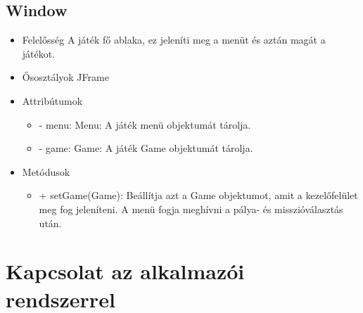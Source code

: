 \subsection{Window}
\begin{itemize}
\item Felelősség \newline
A játék fő ablaka, ez jeleníti meg a menüt és aztán magát a játékot.
\item Ősosztályok\newline
JFrame
\item Attribútumok
	\begin{itemize}
		\item - menu: Menu: A játék menü objektumát tárolja.
		\item - game: Game: A játék Game objektumát tárolja.
	\end{itemize}
\item Metódusok
	\begin{itemize}
		\item + setGame(Game): Beállítja azt a Game objektumot, amit a kezelőfelület meg fog jeleníteni. A menü fogja meghívni a pálya- és misszióválasztás után.
	\end{itemize}
\end{itemize}

\section{Kapcsolat az alkalmazói rendszerrel}

